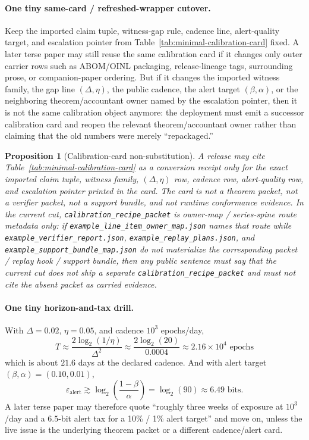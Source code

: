 \documentclass[11pt]{article}
\newtheorem{proposition}{Proposition}
\begin{document}
\paragraph{One tiny same-card / refreshed-wrapper cutover.}
Keep the imported claim tuple, witness-gap rule, cadence line, alert-quality target, and escalation pointer from Table~\ref{tab:minimal-calibration-card} fixed.
A later terse paper may still reuse the same calibration card if it changes only outer carrier rows such as ABOM/OINL packaging, release-lineage tags, surrounding prose, or companion-paper ordering.
But if it changes the imported witness family, the gap line $(\Delta,\eta)$, the public cadence, the alert target $(\beta,\alpha)$, or the neighboring theorem/accountant owner named by the escalation pointer, then it is not the same calibration object anymore: the deployment must emit a successor calibration card and reopen the relevant theorem/accountant owner rather than claiming that the old numbers were merely ``repackaged.''

\begin{proposition}[Calibration-card non-substitution]
A release may cite Table~\ref{tab:minimal-calibration-card} as a conversion receipt only for the exact imported claim tuple, witness family, $(\Delta,\eta)$ row, cadence row, alert-quality row, and escalation pointer printed in the card. The card is not a theorem packet, not a verifier packet, not a support bundle, and not runtime conformance evidence. In the current cut, \nolinkurl{calibration_recipe_packet} is owner-map / series-spine route metadata only: if \nolinkurl{example_line_item_owner_map.json} names that route while \nolinkurl{example_verifier_report.json}, \nolinkurl{example_replay_plans.json}, and \nolinkurl{example_support_bundle_map.json} do not materialize the corresponding packet / replay hook / support bundle, then any public sentence must say that the current cut does not ship a separate \nolinkurl{calibration_recipe_packet} and must not cite the absent packet as carried evidence.
\end{proposition}

\paragraph{One tiny horizon-and-tax drill.}
With $\Delta=0.02$, $\eta=0.05$, and cadence $10^3$ epochs/day,
\[
T \approx \frac{2\log_2(1/\eta)}{\Delta^2}
   \approx \frac{2\log_2(20)}{0.0004}
   \approx 2.16\times 10^4\text{ epochs}
\]
which is about $21.6$ days at the declared cadence. And with alert target $(\beta,\alpha)=(0.10,0.01)$,
\[
\varepsilon_{\mathrm{alert}} \gtrsim \log_2\!\left(\frac{1-\beta}{\alpha}\right)
= \log_2(90) \approx 6.49\text{ bits}.
\]
A later terse paper may therefore quote ``roughly three weeks of exposure at $10^3$/day and a $6.5$-bit alert tax for a 10\% / 1\% alert target'' and move on, unless the live issue is the underlying theorem packet or a different cadence/alert card.
\end{document}

